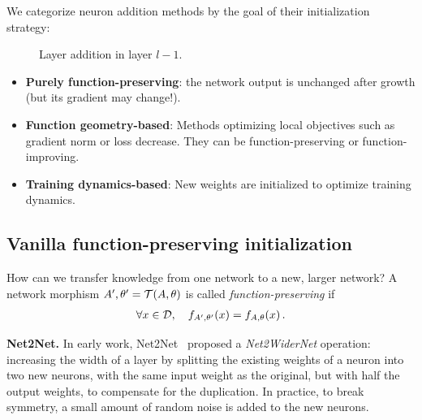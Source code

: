 We categorize neuron addition methods by the goal of their initialization strategy:
\begin{figure}
    \centering
    \begin{minipage}[t]{0.48\linewidth}
        \centering
        
        \caption{Width addition in layer $l-1$.}
        \label{fig:width-addition}
    \end{minipage}
    \hfill
    \begin{minipage}[t]{0.48\linewidth}
        \centering
        
        \caption{Layer addition in layer $l-1$.}
        \label{fig:layer-addition}
    \end{minipage}
\end{figure}
\begin{itemize}\itemsep0em 
    \item \textbf{Purely function-preserving}: the network output is unchanged after growth (but its gradient may change!).
    \item \textbf{Function geometry-based}: Methods optimizing local objectives such as gradient norm or loss decrease. They can be function-preserving or function-improving.
    \item \textbf{Training dynamics-based}: New weights are initialized to optimize training dynamics.
\end{itemize}

\subsection{Vanilla function-preserving initialization}
\label{sec:function_preserving}

How can we transfer knowledge from one network to a new, larger network? A network morphism $A', \theta' = \mathcal{T}(A, \theta)$ is called \emph{function-preserving} if
\begin{align}
    \forall  x \in \mathcal{D}, \quad f_{A', \theta'}(x) = f_{A, \theta}(x) \, .
\end{align}

\textbf{Net2Net.} In early work, Net2Net~\citep{chen_net2net_2016} proposed a \emph{Net2WiderNet} operation: increasing the width of a layer by splitting the existing weights of a neuron into two new neurons, with the same input weight as the original, but with half the output weights, to compensate for the duplication. In practice, to break symmetry, a small amount of random noise is added to the new neurons.

